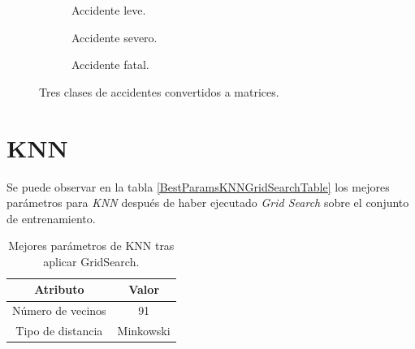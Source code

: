   \begin{figure}[H]
      \centering
      \begin{subfigure}[b]{0.3\textwidth}
        \centering
        
        \caption{Accidente leve.}
        \label{TresClasesAccidentesMatrices:AccidenteLeveImage}
      \end{subfigure}
      \hspace{1em}
      \begin{subfigure}[b]{0.3\textwidth}
        \centering
        
        \caption{Accidente severo.}
        \label{TresClasesAccidentesMatrices:AccidenteSeveroImage}
      \end{subfigure}
      \hspace{1em}
      \begin{subfigure}[b]{0.3\textwidth}
        \centering
        
        \caption{Accidente fatal.}
        \label{TresClasesAccidentesMatrices:AccidenteFatalImage}
      \end{subfigure}

    \caption{Tres clases de accidentes convertidos a matrices.}
    \label{TresClasesAccidentesMatrices}
  \end{figure}

\section{KNN}

  Se puede observar en la tabla \eqref{BestParamsKNNGridSearchTable} los mejores parámetros para \textit{KNN} después de haber ejecutado \textit{Grid Search} sobre el conjunto de entrenamiento.\\

  \begin{table}[H]
      \centering
      \begin{tabular}{ |c|c| }
          \hline
          Atributo & Valor\\
          \hline
              Número de vecinos & 91 \\ 
              Tipo de distancia & Minkowski \\ 
          \hline
      \end{tabular}
      \caption{Mejores parámetros de KNN tras aplicar GridSearch.}
      \label{BestParamsKNNGridSearchTable}
  \end{table}



